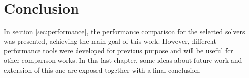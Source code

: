 \chapter{Conclusion}

In section \ref{sec:performance}, the performance comparison for the selected
solvers was presented, achieving the main goal of this work. However, different
performance tools were developed for previous purpose and will be useful for
other comparison works. In this last chapter, some ideas about future work and
extension of this one are exposed together with a final conclusion.



